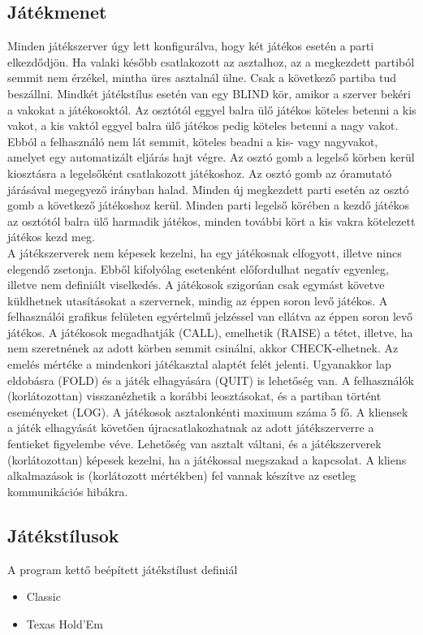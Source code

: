 \subsection{Játékmenet}
Minden játékszerver úgy lett konfigurálva, hogy két játékos esetén a parti elkezdődjön. Ha valaki később csatlakozott az asztalhoz, az a megkezdett partiból semmit nem érzékel, mintha üres asztalnál ülne. Csak a következő partiba tud beszállni. Mindkét játékstílus esetén van egy BLIND kör, amikor a szerver bekéri a vakokat a játékosoktól. Az osztótól eggyel balra ülő játékos köteles betenni a kis vakot, a kis vaktól eggyel balra ülő játékos pedig köteles betenni a nagy vakot. Ebból a felhasználó nem lát semmit, köteles beadni a kis- vagy nagyvakot, amelyet egy automatizált eljárás hajt végre. Az osztó gomb  a legelső körben kerül kiosztásra a legelsőként csatlakozott játékoshoz. Az osztó gomb az óramutató járásával megegyező irányban halad. Minden új megkezdett parti esetén az osztó gomb a következő játékoshoz kerül. Minden parti legelső körében a kezdő játékos az osztótól balra ülő harmadik játékos, minden további kört a kis vakra kötelezett játékos kezd meg.  \\
A játékszerverek nem képesek kezelni, ha egy játékosnak elfogyott, illetve nincs elegendő zsetonja. Ebből kifolyólag esetenként előfordulhat negatív egyenleg, illetve nem definiált viselkedés. A játékosok szigorúan csak egymást követve küldhetnek utasításokat a szervernek, mindig az éppen soron levő játékos. A felhasználói grafikus felületen egyértelmű jelzéssel van ellátva az éppen soron levő játékos. A játékosok megadhatják (CALL), emelhetik (RAISE) a tétet, illetve, ha nem szeretnének az adott körben semmit csinálni, akkor CHECK-elhetnek. Az emelés mértéke a mindenkori játékasztal alaptét felét jelenti. Ugyanakkor lap eldobásra (FOLD) és a játék elhagyására (QUIT) is lehetőség van. A felhasználók (korlátozottan) visszanézhetik a korábbi leosztásokat, és a partiban történt eseményeket (LOG). A játékosok asztalonkénti maximum száma 5 fő. A kliensek a játék elhagyását követően újracsatlakozhatnak az adott játékszerverre a fentieket figyelembe véve. Lehetőség van asztalt váltani, és a játékszerverek (korlátozottan) képesek kezelni, ha a játékossal megszakad a kapcsolat. A kliens alkalmazások is (korlátozott mértékben) fel vannak készítve az esetleg kommunikációs hibákra.

\subsection{Játékstílusok} \label{subsubsec:game_styles}
A program kettő beépített játékstílust definiál
\begin{itemize}[leftmargin=2cm]
\item Classic \cite{five_card_draw}
\item Texas Hold'Em \cite{texas_holdem}
\end{itemize}

